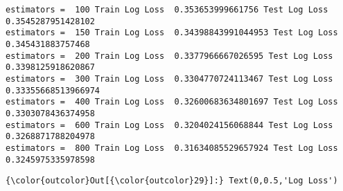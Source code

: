 \documentclass[11pt]{article}
\begin{document}
    \begin{Verbatim}[commandchars=\\\{\}]
estimators =  100 Train Log Loss  0.353653999661756 Test Log Loss  0.3545287951428102
estimators =  150 Train Log Loss  0.34398843991044953 Test Log Loss  0.345431883757468
estimators =  200 Train Log Loss  0.3377966667026595 Test Log Loss  0.3398125918620867
estimators =  300 Train Log Loss  0.3304770724113467 Test Log Loss  0.33355668513966974
estimators =  400 Train Log Loss  0.32600683634801697 Test Log Loss  0.3303078436374958
estimators =  600 Train Log Loss  0.3204024156068844 Test Log Loss  0.3268871788204978
estimators =  800 Train Log Loss  0.31634085529657924 Test Log Loss  0.3245975335978598

    \end{Verbatim}

\begin{Verbatim}[commandchars=\\\{\}]
{\color{outcolor}Out[{\color{outcolor}29}]:} Text(0,0.5,'Log Loss')
\end{Verbatim}
            
    \begin{center}
    \end{center}
    { \hspace*{\fill} \\}
    
\end{document}
